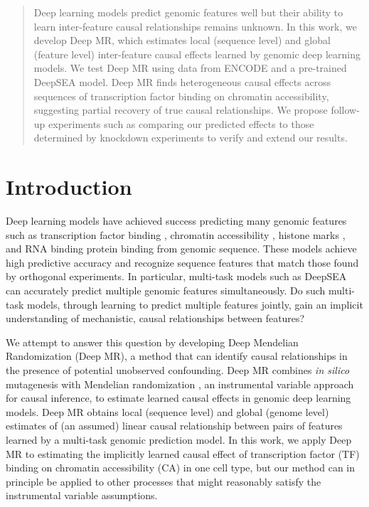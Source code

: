 \documentclass{article}
\begin{document}
\begin{abstract}
Deep learning models predict genomic features well but their ability to learn inter-feature causal relationships remains unknown. In this work, we develop Deep MR, which estimates local (sequence level) and global (feature level) inter-feature causal effects learned by genomic deep learning models. We test Deep MR using data from ENCODE and a pre-trained DeepSEA model. Deep MR finds heterogeneous causal effects across sequences of transcription factor binding on chromatin accessibility, suggesting partial recovery of true causal relationships. We propose follow-up experiments such as comparing our predicted effects to those determined by knockdown experiments to verify and extend our results.
\end{abstract}

\section{Introduction}
\label{introduction}
Deep learning models have achieved success predicting many genomic features such as transcription factor binding \cite{alipanahi2015predicting, zhou2015predicting}, chromatin accessibility \cite{zhou2015predicting, kelley2016basset}, histone marks \cite{yin2019deephistone}, and RNA binding protein binding \cite{alipanahi2015predicting, pan2017rna, gandhi2018cdeepbind, zheng2018deep} from genomic sequence. These models achieve high predictive accuracy and recognize sequence features that match those found by orthogonal experiments. In particular, multi-task models such as DeepSEA~\cite{zhou2015predicting} can accurately predict multiple genomic features simultaneously. Do such multi-task models, through learning to predict multiple features jointly, gain an implicit understanding of mechanistic, causal relationships between features?

We attempt to answer this question by developing Deep Mendelian Randomization (Deep MR), a method that can identify causal relationships in the presence of potential unobserved confounding. Deep MR combines \textit{in silico} mutagenesis with Mendelian randomization \cite{lawlor2008mendelian}, an instrumental variable approach for causal inference, to estimate learned causal effects in genomic deep learning models. Deep MR obtains local (sequence level) and global (genome level) estimates of (an assumed) linear causal relationship between pairs of features learned by a multi-task genomic prediction model. In this work, we apply Deep MR to estimating the implicitly learned causal effect of transcription factor (TF) binding on chromatin accessibility (CA) in one cell type, but our method can in principle be applied to other processes that might reasonably satisfy the instrumental variable assumptions.
\end{document}

